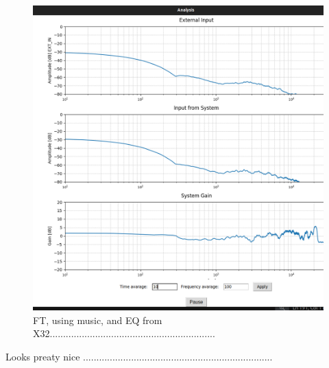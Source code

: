 \begin{figure}[H]
	\centering
	\includegraphics[width=0.6
	\linewidth]{Figures/Coro_FT_music_EQX32.png}
	\caption{FT, using music, and EQ from X32..............................................................}
	\label{fig:Coro_FT_music}
\end{figure}

Looks preaty nice .......................................................................

